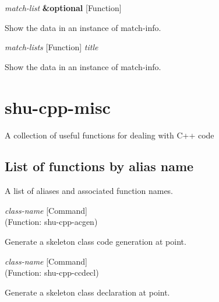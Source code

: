 \vspace{1em}
\noindent
{}
\usebox{\funcname}\emph{match-list} \textbf{\&optional}
 \hfill [Function]
\hspace*{\wd\funcname}

\begin{doc-string}
Show the data in an instance of match-info.
\end{doc-string}

\vspace{1em}
\noindent
{}
\usebox{\funcname}\emph{match-lists}
 \hfill [Function]
\hspace*{\wd\funcname}\emph{title}

\begin{doc-string}
Show the data in an instance of match-info.
\end{doc-string}

\eject
\section{shu-cpp-misc}


A collection of useful functions for dealing with C++ code


\subsection{List of functions by alias name}

A list of aliases and associated function names.



\vspace{1em}
\noindent
{}
\usebox{\funcname}\emph{class-name}
 \hfill [Command]\\%
 (Function: shu-cpp-acgen)

\begin{doc-string}
Generate a skeleton class code generation at point.
\end{doc-string}

\vspace{1em}
\noindent
{}
\usebox{\funcname}\emph{class-name}
 \hfill [Command]\\%
 (Function: shu-cpp-ccdecl)

\begin{doc-string}
Generate a skeleton class declaration at point.
\end{doc-string}

